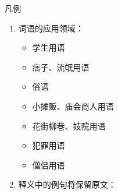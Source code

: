
{\fontSCSansSec\Huge 凡例}

\begin{enumerate}
  \item 词语的应用领域：
    \begin{itemize}
      \item {}学生用语
      \item {}痞子、流氓用语
      \item {}俗语
      \item {}小摊贩、庙会商人用语
      \item {}花街柳巷、妓院用语
      \item {}犯罪用语
      \item {}僧侣用语
    \end{itemize}
  \item 释义中的例句将保留原文：\\
\end{enumerate}

\clearpage
